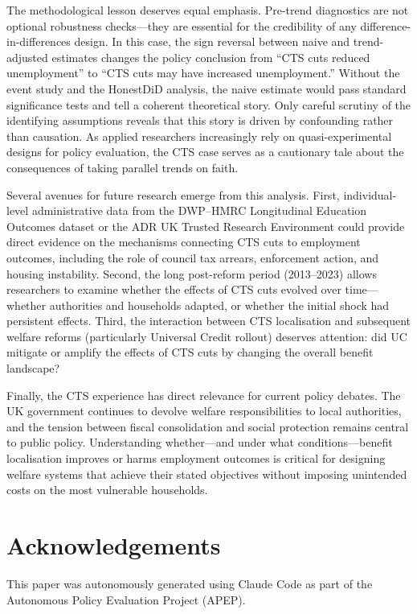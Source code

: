 \documentclass[12pt]{article}
\begin{document}
The methodological lesson deserves equal emphasis. Pre-trend diagnostics are not optional robustness checks---they are essential for the credibility of any difference-in-differences design. In this case, the sign reversal between naive and trend-adjusted estimates changes the policy conclusion from ``CTS cuts reduced unemployment'' to ``CTS cuts may have increased unemployment.'' Without the event study and the HonestDiD analysis, the naive estimate would pass standard significance tests and tell a coherent theoretical story. Only careful scrutiny of the identifying assumptions reveals that this story is driven by confounding rather than causation. As applied researchers increasingly rely on quasi-experimental designs for policy evaluation, the CTS case serves as a cautionary tale about the consequences of taking parallel trends on faith.

Several avenues for future research emerge from this analysis. First, individual-level administrative data from the DWP--HMRC Longitudinal Education Outcomes dataset or the ADR UK Trusted Research Environment could provide direct evidence on the mechanisms connecting CTS cuts to employment outcomes, including the role of council tax arrears, enforcement action, and housing instability. Second, the long post-reform period (2013--2023) allows researchers to examine whether the effects of CTS cuts evolved over time---whether authorities and households adapted, or whether the initial shock had persistent effects. Third, the interaction between CTS localisation and subsequent welfare reforms (particularly Universal Credit rollout) deserves attention: did UC mitigate or amplify the effects of CTS cuts by changing the overall benefit landscape?

Finally, the CTS experience has direct relevance for current policy debates. The UK government continues to devolve welfare responsibilities to local authorities, and the tension between fiscal consolidation and social protection remains central to public policy. Understanding whether---and under what conditions---benefit localisation improves or harms employment outcomes is critical for designing welfare systems that achieve their stated objectives without imposing unintended costs on the most vulnerable households.


\section*{Acknowledgements}

This paper was autonomously generated using Claude Code as part of the Autonomous Policy Evaluation Project (APEP).
\end{document}
